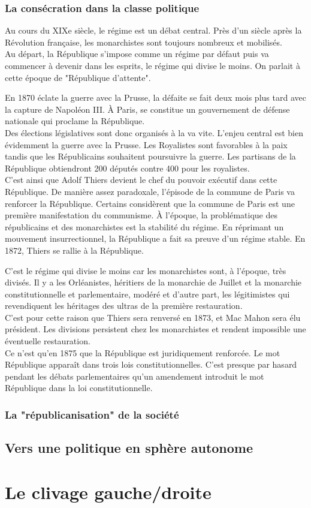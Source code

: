 \documentclass[10pt, a4paper, openany]{book}
\begin{document}
\subsection{La consécration dans la classe politique}

Au cours du XIXe siècle, le régime est un débat central. Près d'un siècle après la Révolution française, les monarchistes sont toujours nombreux et mobilisés. \\
Au départ, la République s'impose comme un régime par défaut puis va commencer à devenir dans les esprits, le régime qui divise le moins. On parlait à cette époque de "République d'attente".


En 1870 éclate la guerre avec la Prusse, la défaite se fait deux mois plus tard avec la capture de Napoléon III. À Paris, se constitue un gouvernement de défense nationale qui proclame la République. \\
Des élections législatives sont donc organisés à la va vite. L'enjeu central est bien évidemment la guerre avec la Prusse. Les Royalistes sont favorables à la paix tandis que les Républicains souhaitent poursuivre la guerre. Les partisans de la République obtiendront 200 députés contre 400 pour les royalistes. \\
C'est ainsi que Adolf Thiers devient le chef du pouvoir exécutif dans cette République. De manière assez paradoxale, l'épisode de la commune de Paris va renforcer la République. Certains considèrent que la commune de Paris est une première manifestation du communisme. À l'époque, la problématique des républicains et des monarchistes est la stabilité du régime. En réprimant un mouvement insurrectionnel, la République a fait sa preuve d'un régime stable. En 1872, Thiers se rallie à la République.


C'est le régime qui divise le moins car les monarchistes sont, à l'époque, très divisés. Il y a les Orléanistes, héritiers de la monarchie de Juillet et la monarchie constitutionnelle et parlementaire, modéré et d'autre part, les légitimistes qui revendiquent les héritages des ultras de la première restauration. \\
C'est pour cette raison que Thiers sera renversé en 1873, et Mac Mahon sera élu président. Les divisions persistent chez les monarchistes et rendent impossible une éventuelle restauration. \\
Ce n'est qu'en 1875 que la République est juridiquement renforcée. Le mot République apparaît dans trois lois constitutionnelles. C'est presque par hasard pendant les débats parlementaires qu'un amendement introduit le mot République dans la loi constitutionnelle. 



\subsection{La "républicanisation" de la société}


\section{Vers une politique en sphère autonome}


\chapter{Le clivage gauche/droite}

\chapter{}
\end{document}
